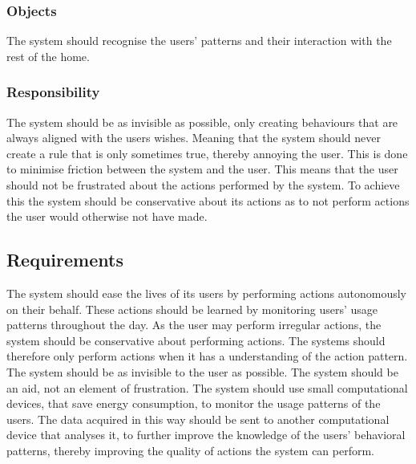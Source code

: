 \subsubsection{Objects}

The system should recognise the users' patterns and their interaction with the
rest of the home.

\subsubsection{Responsibility}

The system should be as invisible as possible, only creating behaviours that are always aligned with the users wishes. Meaning that the system should never create a rule that is only sometimes true, thereby annoying the user. This is done to minimise friction between the system and the user. This means that the user should not be frustrated about the actions performed by the system. To achieve this the system should be conservative about its actions as to not perform actions the user would otherwise not have made.

\subsection{Requirements}

The system should ease the lives of its users by performing actions autonomously
on their behalf. These actions should be learned by monitoring users' usage
patterns throughout the day. As the user may perform irregular actions, the
system should be conservative about performing actions. The systems should
therefore only perform actions when it has a understanding of the action
pattern. The system should be as invisible to the user as possible. The system
should be an aid, not an element of frustration. The system should use small
computational devices, that save energy consumption, to monitor the usage
patterns of the users. The data acquired in this way should be sent to another
computational device that analyses it, to further improve the knowledge of the
users' behavioral patterns, thereby improving the quality of actions the system can perform.
